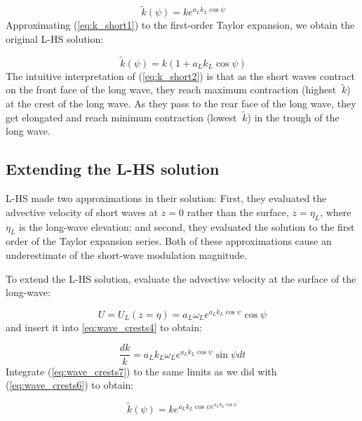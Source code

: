 \documentclass[draft]{agujournal2019}
\begin{document}
\begin{equation}
\label{eq:k_short1}
\ \widetilde k(\psi) = k e^{a_L k_L \cos{\psi}}
\end{equation}
Approximating (\ref{eq:k_short1}) to the first-order Taylor expansion,
we obtain the original L-HS solution:

\begin{equation}
\label{eq:k_short2}
\ \widetilde k(\psi) = k (1 + a_L k_L \cos{\psi})
\end{equation}
The intuitive interpretation of (\ref{eq:k_short2}) is that as the short waves
contract on the front face of the long wave, they reach maximum contraction
(highest $\ \widetilde k$) at the crest of the long wave.
As they pass to the rear face of the long wave, they get elongated and reach
minimum contraction (lowest $\ \widetilde k$) in the trough of the long wave.

\subsection{Extending the L-HS solution}

L-HS made two approximations in their solution:
First, they evaluated the advective velocity of short waves at $z = 0$
rather than the surface, $z = \eta_L$, where $\eta_L$ is the long-wave
elevation; and second, they evaluated the solution to the first order
of the Taylor expansion series.
Both of these approximations cause an underestimate of the short-wave
modulation magnitude.

To extend the L-HS solution, evaluate the advective velocity at the surface
of the long-wave:

\begin{equation}
\label{eq:U_L2}
U = U_L(z=\eta) = a_L \omega_L e^{a_L k_L \cos{\psi}} \cos{\psi}
\end{equation}
and insert it into \ref{eq:wave_crests4} to obtain:

\begin{equation}
\label{eq:wave_crests7}
\dfrac{dk}{k} = a_L k_L \omega_L e^{a_L k_L \cos{\psi}} \sin{\psi} dt
\end{equation}
Integrate (\ref{eq:wave_crests7}) to the same limits as we did with
(\ref{eq:wave_crests6}) to obtain:

\begin{equation}
\label{eq:k_short3}
\widetilde{k}(\psi) = k e^{a_L k_L \cos{\psi} e^{a_L k_L \cos{\psi}}}
\end{equation}
\end{document}
